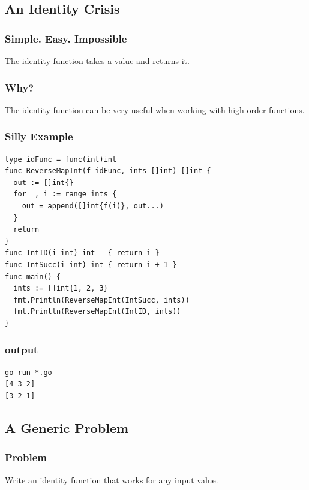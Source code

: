 \documentclass{beamer}
\begin{document}
\subsection{An Identity Crisis}
\begin{frame}
  \frametitle{Simple. Easy. Impossible}
  The identity function takes a value and returns it.
\end{frame}

\begin{frame}
  \frametitle{Why?}
  The identity function can be very useful when working with
  high-order functions.
\end{frame}

\begin{frame}[fragile]
  \frametitle{Silly Example}
\begin{lstlisting}[language=Golang]
type idFunc = func(int)int
func ReverseMapInt(f idFunc, ints []int) []int {
  out := []int{}
  for _, i := range ints {
    out = append([]int{f(i)}, out...)
  }
  return
}
func IntID(i int) int   { return i }
func IntSucc(i int) int { return i + 1 }
func main() {
  ints := []int{1, 2, 3}
  fmt.Println(ReverseMapInt(IntSucc, ints))
  fmt.Println(ReverseMapInt(IntID, ints))
}
\end{lstlisting}
\end{frame}

\begin{frame}[fragile]
  \frametitle{output}
\begin{center}
\begin{lstlisting}
go run *.go
[4 3 2]
[3 2 1]
\end{lstlisting}
  \end{center}
\end{frame}

\subsection{A Generic Problem}

\begin{frame}
  \frametitle{Problem}
  Write an identity function that works for any input value.
\end{frame}
\end{document}
